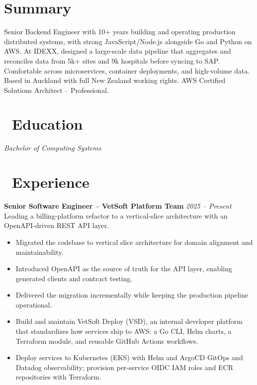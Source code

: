 \documentclass{resume}
\begin{document}


  \vspace{2em}

\section*{Summary}
Senior Backend Engineer with 10+ years building and operating production distributed systems, with strong JavaScript/Node.js alongside Go and Python on AWS. At IDEXX, designed a large-scale data pipeline that aggregates and reconciles data from 5k+ sites and 9k hospitals before syncing to SAP. Comfortable across microservices, container deployments, and high-volume data. Based in Auckland with full New Zealand working rights. AWS Certified Solutions Architect -- Professional.

\section{\faGraduationCap\ Education}
\textit{Bachelor of Computing Systems}


\section{\faUsers\ Experience}
\vspace{1em}
\textbf{Senior Software Engineer -- VetSoft Platform Team} \hfill \textit{2025 -- Present} \\
Leading a billing-platform refactor to a vertical-slice architecture with an OpenAPI-driven REST API layer.
\begin{itemize}
  \item Migrated the codebase to vertical slice architecture for domain alignment and maintainability.
  \item Introduced OpenAPI as the source of truth for the API layer, enabling generated clients and contract testing.
  \item Delivered the migration incrementally while keeping the production pipeline operational.
  \item Build and maintain VetSoft Deploy (VSD), an internal developer platform that standardizes how services ship to AWS: a Go CLI, Helm charts, a Terraform module, and reusable GitHub Actions workflows.
  \item Deploy services to Kubernetes (EKS) with Helm and ArgoCD GitOps and Datadog observability; provision per-service OIDC IAM roles and ECR repositories with Terraform.
\end{itemize}
\end{document}
